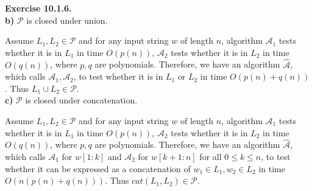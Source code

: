 \documentclass[a4paper]{article}
\newenvironment{exercise}[1]{
	\par
	\noindent\textbf{Exercise #1.}\quad
}{
	\par
	\bigskip
}
\begin{document}
\begin{exercise}{10.1.6} \hspace{0pt}\\
\textbf{b)} $\mathcal P$ is closed under union.\par
Assume $L_1,L_2\in\mathcal P$ and for any input string $w$ of length $n$, algorithm $\mathcal A_1$ tests whether it is in
$L_1$ in time $O(p(n))$, $\mathcal A_2$ tests whether it is in $L_2$ in time $O(q(n))$, where $p,q$ are polynomials.
Therefore, we have an algorithm $\widehat{\mathcal A}$, which calls $\mathcal A_1,\mathcal A_2$, to test whether it is in
$L_1$ or $L_2$ in time $O(p(n)+q(n))$. Thus $L_1\cup L_2\in\mathcal P$.\\
\textbf{c)} $\mathcal P$ is closed under concatenation.\par
Assume $L_1,L_2\in\mathcal P$ and for any input string $w$ of length $n$, algorithm $\mathcal A_1$ tests whether it is in
$L_1$ in time $O(p(n))$, $\mathcal A_2$ tests whether it is in $L_2$ in time $O(q(n))$, where $p,q$ are polynomials.
Therefore, we have an algorithm $\widehat{\mathcal A}$, which calls $\mathcal A_1$ for $w[1:k]$ and $\mathcal A_2$ for
$w[k+1:n]$ for all $0\leqslant k\leqslant n$, to test whether it can be expressed as a concatenation of $w_1\in L_1,w_2\in L_2$
in time $O\left(n\left(p(n)+q(n)\right)\right)$. Thus $\textit{cat}(L_1,L_2)\in\mathcal P$.\\
\end{exercise}
\end{document}
